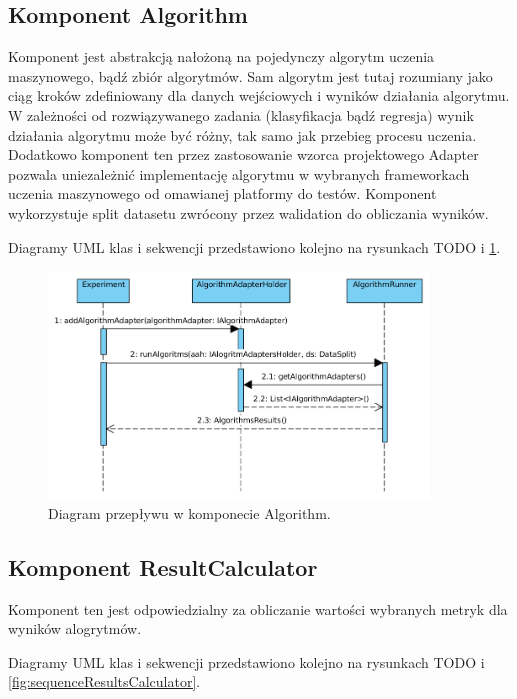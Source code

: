 \documentclass[12pt]{article}
\begin{document}
\subsection{Komponent Algorithm}

Komponent jest abstrakcją nałożoną na pojedynczy algorytm uczenia maszynowego, bądź zbiór algorytmów. Sam algorytm jest tutaj rozumiany jako ciąg kroków zdefiniowany dla danych wejściowych i wyników działania algorytmu. W zależności od rozwiązywanego zadania (klasyfikacja bądź regresja) wynik działania algorytmu może być różny, tak samo jak przebieg procesu uczenia. Dodatkowo komponent ten przez zastosowanie wzorca projektowego Adapter pozwala uniezależnić implementację algorytmu w wybranych frameworkach uczenia maszynowego od omawianej platformy do testów. Komponent wykorzystuje split datasetu zwrócony przez walidation do obliczania wyników. 

Diagramy UML klas i sekwencji przedstawiono kolejno na rysunkach TODO i \ref{fig:sequenceAlgorithm}.

\begin{figure}
	\centering
	\includegraphics[width=0.9\textwidth]{img/sequenceAlgorithm.png}
	\caption{Diagram przepływu w komponecie Algorithm.}
	\label{fig:sequenceAlgorithm}
\end{figure}

\subsection{Komponent ResultCalculator}

Komponent ten jest odpowiedzialny za obliczanie wartości wybranych metryk dla wyników alogrytmów.


Diagramy UML klas i sekwencji przedstawiono kolejno na rysunkach TODO i \ref{fig:sequenceResultsCalculator}.
\end{document}
